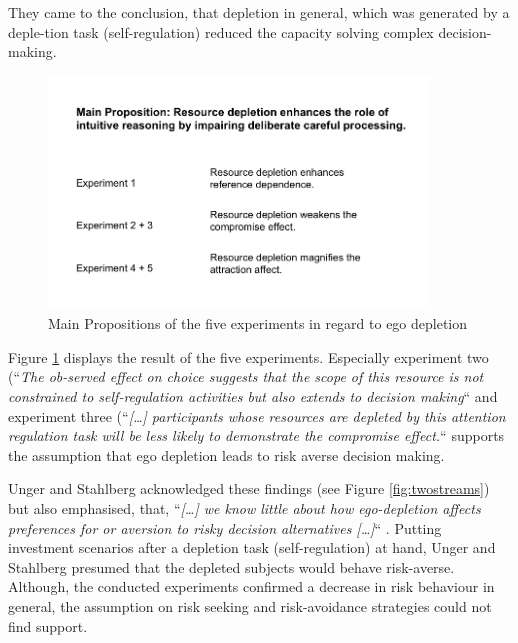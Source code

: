 They came to the conclusion, that depletion in general, which was generated by a deple-tion task (self-regulation) reduced the capacity solving complex decision-making.\par
\begin{figure}[h!]
	\includegraphics[width=0.9\textwidth]{images/mainpropositions.png}
  \caption{Main Propositions of the five experiments in regard to ego depletion \citep{pocheptsova2009deciding}}\label{fig:mainpropositions}
\end{figure}
Figure \ref{fig:mainpropositions} displays the result of the five experiments. Especially experiment two (“\emph{The ob-served effect on choice suggests that the scope of this resource is not constrained to self-regulation activities but also extends to decision making}“ \citep[p.~350]{pocheptsova2009deciding} and experiment three (“\emph{[\ldots] participants whose resources are depleted by this attention regulation task will be less likely to demonstrate the compromise effect.}“ \citep[p.~350]{pocheptsova2009deciding} supports the assumption that ego depletion leads to risk averse decision making.\par
Unger and Stahlberg acknowledged these findings (see Figure \ref{fig:twostreams}) but also emphasised, that, “\emph{[\ldots] we know little about how ego-depletion affects preferences for or aversion to risky decision alternatives [\ldots]}“ \citep[p.~29]{unger2011ego}. Putting investment scenarios after a depletion task (self-regulation) at hand, Unger and Stahlberg presumed that the depleted subjects would behave risk-averse. Although, the conducted experiments confirmed a decrease in risk behaviour in general, the assumption on risk seeking and risk-avoidance strategies could not find support. 

